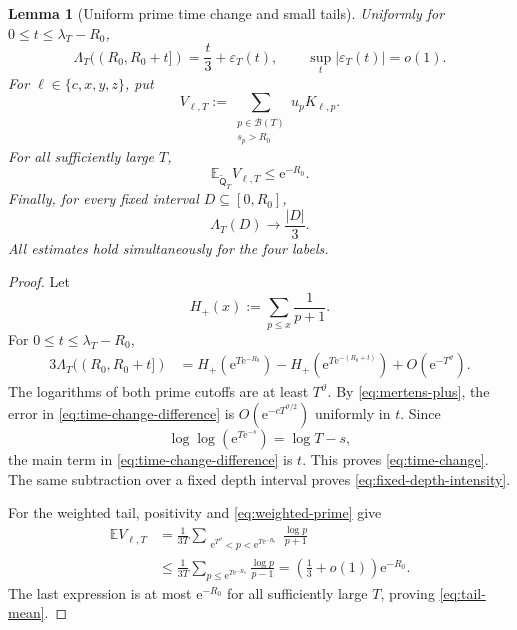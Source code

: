 \documentclass[11pt]{article}
\numberwithin{equation}{section}
\theoremstyle{plain}
\newtheorem{lemma}[theorem]{Lemma}
\newcommand{\E}{\mathbb E}
\newcommand{\1}{\mathbf 1}
\newcommand{\e}{\mathrm e}
\newcommand{\cB}{\mathcal B}
\begin{document}
\begin{lemma}[Uniform prime time change and small tails]
\label{lem:prime-time-change}
Uniformly for $0\le t\le\lambda_T-R_0$,
\begin{equation}\label{eq:time-change}
 \Lambda_T((R_0,R_0+t])
 =\frac t3+\varepsilon_T(t),
 \qquad
 \sup_t|\varepsilon_T(t)|=o(1).
\end{equation}
For $\ell\in\{c,x,y,z\}$, put
\begin{equation}\label{eq:tail-weight}
 V_{\ell,T}:=
 \sum_{\substack{p\in\cB(T)\\s_p>R_0}}u_pK_{\ell,p}.
\end{equation}
For all sufficiently large $T$,
\begin{equation}\label{eq:tail-mean}
 \E_{\widetilde{\mathsf Q}_T}V_{\ell,T}\le\e^{-R_0}.
\end{equation}
Finally, for every fixed interval $D\subseteq[0,R_0]$,
\begin{equation}\label{eq:fixed-depth-intensity}
 \Lambda_T(D)\longrightarrow\frac{|D|}{3}.
\end{equation}
All estimates hold simultaneously for the four labels.
\end{lemma}

\begin{proof}
Let
\[
 H_+(x):=\sum_{p\le x}\frac1{p+1}.
\]
For $0\le t\le\lambda_T-R_0$,
\begin{align}
 3\Lambda_T((R_0,R_0+t])
 &=
 H_+(\e^{T\e^{-R_0}})
 -H_+(\e^{T\e^{-(R_0+t)}})
 +O(\e^{-T^\vartheta}).                    \label{eq:time-change-difference}
\end{align}
The logarithms of both prime cutoffs are at least $T^\vartheta$.  By
\eqref{eq:mertens-plus}, the error in
\eqref{eq:time-change-difference} is
$O(\e^{-cT^{\vartheta/2}})$ uniformly in $t$.  Since
\[
 \log\log(\e^{T\e^{-s}})=\log T-s,
\]
the main term in \eqref{eq:time-change-difference} is $t$.  This proves
\eqref{eq:time-change}.  The same subtraction over a fixed depth interval
proves \eqref{eq:fixed-depth-intensity}.

For the weighted tail, positivity and
\eqref{eq:weighted-prime} give
\begin{align*}
 \E V_{\ell,T}
 &=\frac1{3T}
 \sum_{\substack{\e^{T^\vartheta}<p<\e^{T\e^{-R_0}}}}
 \frac{\log p}{p+1}\\
 &\le\frac1{3T}
 \sum_{p\le\e^{T\e^{-R_0}}}\frac{\log p}{p-1}
 =\left(\frac13+o(1)\right)\e^{-R_0}.
\end{align*}
The last expression is at most $\e^{-R_0}$ for all sufficiently large
$T$, proving \eqref{eq:tail-mean}.
\end{proof}
\end{document}
